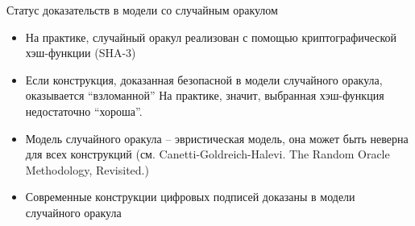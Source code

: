 \documentclass[usenames,dvipsnames,8pt,aspectratio=169]{beamer}
\begin{document}
\begin{frame}{Статус доказательств в модели со случайным оракулом}
	\Large
	
	\begin{itemize}
		\itemsep 10pt
		\item На практике, случайный оракул реализован с помощью криптографической хэш-функции (SHA-3)
		\item Если конструкция, доказанная безопасной в модели случайного оракула, оказывается ``взломанной'' На практике,  значит, выбранная  хэш-функция недостаточно ``хороша''.
		\item Модель случайного оракула -- {\color{Orange} эвристическая } модель, она может быть неверна для  всех конструкций (см. Canetti-Goldreich-Halevi. The Random Oracle Methodology, Revisited.)
		\item Современные конструкции цифровых подписей доказаны в модели случайного оракула
	\end{itemize}
\end{frame}
\end{document}
